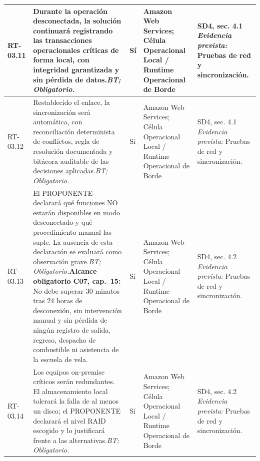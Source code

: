 \begin{paginaHorizontalSynaptix}
\begin{longtable}{|L{0.09\AnchoMatrizTDoce}|L{0.385\AnchoMatrizTDoce}|L{0.065\AnchoMatrizTDoce}|L{0.18\AnchoMatrizTDoce}|L{0.28\AnchoMatrizTDoce}|}
RT-\allowbreak{}03.\allowbreak{}11 &
Durante la operación desconectada, la solución continuará registrando las transacciones operacionales críticas de forma local, con integridad garantizada y sin pérdida de datos.\newline\textit{BT; Obligatorio.} &
Sí &
Amazon Web Services; Célula Operacional Local / Runtime Operacional de Borde &
SD4, sec. 4.1 \newline\textit{Evidencia prevista:} Pruebas de red y sincronización. \\ \hline

RT-\allowbreak{}03.\allowbreak{}12 &
Restablecido el enlace, la sincronización será automática, con reconciliación determinista de conflictos, regla de resolución documentada y bitácora auditable de las decisiones aplicadas.\newline\textit{BT; Obligatorio.} &
Sí &
Amazon Web Services; Célula Operacional Local / Runtime Operacional de Borde &
SD4, sec. 4.1 \newline\textit{Evidencia prevista:} Pruebas de red y sincronización. \\ \hline

RT-\allowbreak{}03.\allowbreak{}13 &
El PROPONENTE declarará qué funciones NO estarán disponibles en modo desconectado y qué procedimiento manual las suple. La ausencia de esta declaración se evaluará como observación grave.\newline\textit{BT; Obligatorio.}\newline\textbf{Alcance obligatorio C07, cap.~15:} No debe superar 30 minutos tras 24 horas de desconexión, sin intervención manual y sin pérdida de ningún registro de salida, regreso, despacho de combustible ni asistencia de la escuela de vela. &
Sí &
Amazon Web Services; Célula Operacional Local / Runtime Operacional de Borde &
SD4, sec. 4.2 \newline\textit{Evidencia prevista:} Pruebas de red y sincronización. \\ \hline

RT-\allowbreak{}03.\allowbreak{}14 &
Los equipos on-premise críticos serán redundantes. El almacenamiento local tolerará la falla de al menos un disco; el PROPONENTE declarará el nivel RAID escogido y lo justificará frente a las alternativas.\newline\textit{BT; Obligatorio.} &
Sí &
Amazon Web Services; Célula Operacional Local / Runtime Operacional de Borde &
SD4, sec. 4.2 \newline\textit{Evidencia prevista:} Pruebas de red y sincronización. \\ \hline


\end{longtable}
\end{paginaHorizontalSynaptix}
